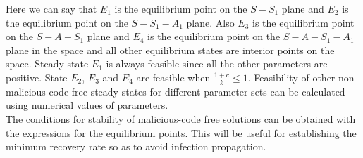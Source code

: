 Here we can say that $E_1$ is the equilibrium point on the $S-S_1$ plane and $E_2$ is the equilibrium point on the $S-S_1-A_1$ plane. Also $E_3$ is the equilibrium point on the $S-A-S_1$ plane and $E_4$ is the equilibrium point on the $S-A-S_1-A_1$ plane in the space and all other equilibrium states are interior points on the space. Steady state $E_1$ is always feasible since all the other parameters are positive. State $E_2$, $E_3$ and $E_4$ are feasible when $\frac{1+c}{k} \leq 1.$ Feasibility of other non-malicious code free steady states for different parameter sets can be calculated using numerical values of parameters.\\

The conditions for stability of malicious-code free solutions can be obtained with the expressions for the equilibrium points. This will be useful for establishing the minimum recovery rate so as to avoid infection propagation.



